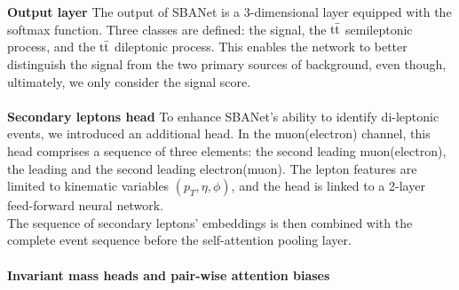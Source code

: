\\
\\
\textbf{Output layer} The output of SBANet is a 3-dimensional layer equipped with the softmax function. Three classes are defined: the signal, the ${{\text{t}}{\bar{\text{t}}}}$ semileptonic process, and the ${{\text{t}}{\bar{\text{t}}}}$ dileptonic process. This enables the network to better distinguish the signal from the two primary sources of background, even though, ultimately, we only consider the signal score.
\\  
\\
\textbf{Secondary leptons head} 
To enhance SBANet's ability to identify di-leptonic events, we introduced an additional head. In the muon(electron) channel, this head comprises a sequence of three elements: the second leading muon(electron), the leading and the second leading electron(muon).
The lepton features are limited to kinematic variables $(p_T,\eta,\phi)$, and the head is linked to a 2-layer feed-forward neural network.\\
The sequence of secondary leptons' embeddings is then combined with the complete event sequence before the self-attention pooling layer.
\\
\\
\textbf{Invariant mass heads and pair-wise attention biases} 

